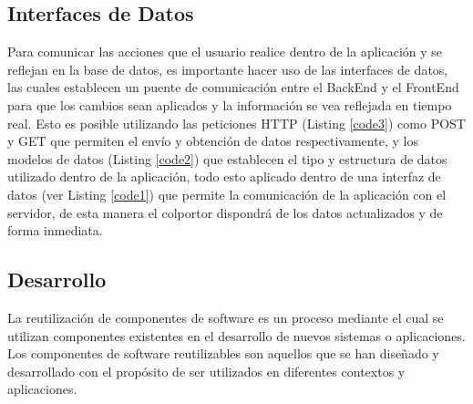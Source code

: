 \documentclass[runningheads]{llncs}
\begin{document}
            \subsection*{Interfaces de Datos}
                Para comunicar las acciones que el usuario realice dentro de la aplicación y se reflejan en la base de datos, es importante hacer uso de las interfaces de datos, las cuales establecen un puente de comunicación entre el BackEnd y el FrontEnd para que los cambios sean aplicados y la información se vea reflejada en tiempo real.
                Esto es posible utilizando las peticiones HTTP (Listing \ref{code3}) como POST y GET que permiten el envío y obtención de datos respectivamente, y los modelos de datos (Listing \ref{code2}) que establecen el tipo y estructura de datos utilizado dentro de la aplicación, todo esto aplicado dentro de una interfaz de datos (ver Listing \ref{code1}) que permite la comunicación de la aplicación con el servidor, de esta manera el colportor dispondrá de los datos actualizados y de forma inmediata.
                

        \subsection{Desarrollo}
            La reutilización de componentes de software es un proceso mediante el cual se utilizan componentes existentes en el desarrollo de nuevos sistemas o aplicaciones. Los componentes de software reutilizables son aquellos que se han diseñado y desarrollado con el propósito de ser utilizados en diferentes contextos y aplicaciones.
\end{document}
